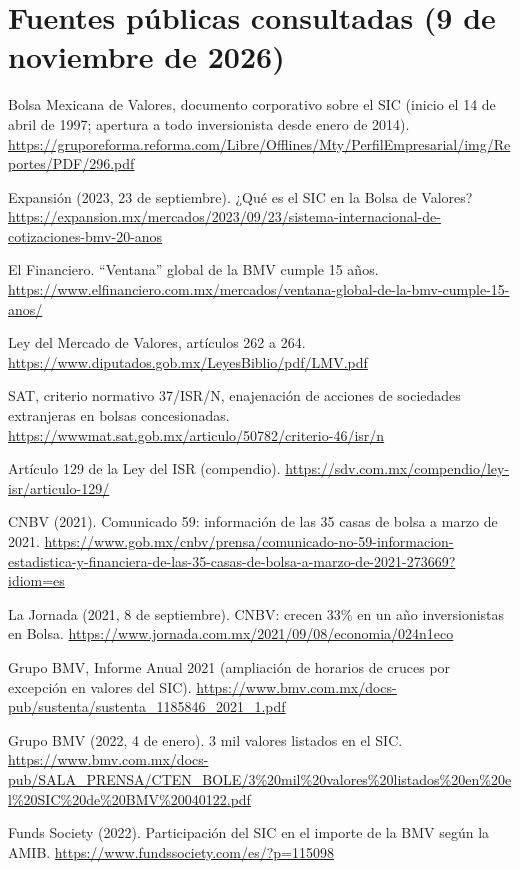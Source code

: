 \documentclass[11pt,letterpaper]{article}
\theoremstyle{definition}
\theoremstyle{plain}
\begin{document}
\section*{Fuentes públicas consultadas (9 de noviembre de 2026)}
\begin{enumerate}[label={[\arabic*]},leftmargin=*]\raggedright\small
\item Bolsa Mexicana de Valores, documento corporativo sobre el SIC (inicio el 14 de abril de 1997; apertura a todo inversionista desde enero de 2014). \url{https://gruporeforma.reforma.com/Libre/Offlines/Mty/PerfilEmpresarial/img/Reportes/PDF/296.pdf}
\item Expansión (2023, 23 de septiembre). ¿Qué es el SIC en la Bolsa de Valores? \url{https://expansion.mx/mercados/2023/09/23/sistema-internacional-de-cotizaciones-bmv-20-anos}
\item El Financiero. ``Ventana'' global de la BMV cumple 15 años. \url{https://www.elfinanciero.com.mx/mercados/ventana-global-de-la-bmv-cumple-15-anos/}
\item Ley del Mercado de Valores, artículos 262 a 264. \url{https://www.diputados.gob.mx/LeyesBiblio/pdf/LMV.pdf}
\item SAT, criterio normativo 37/ISR/N, enajenación de acciones de sociedades extranjeras en bolsas concesionadas. \url{https://wwwmat.sat.gob.mx/articulo/50782/criterio-46/isr/n}
\item Artículo 129 de la Ley del ISR (compendio). \url{https://sdv.com.mx/compendio/ley-isr/articulo-129/}
\item CNBV (2021). Comunicado 59: información de las 35 casas de bolsa a marzo de 2021. \url{https://www.gob.mx/cnbv/prensa/comunicado-no-59-informacion-estadistica-y-financiera-de-las-35-casas-de-bolsa-a-marzo-de-2021-273669?idiom=es}
\item La Jornada (2021, 8 de septiembre). CNBV: crecen 33\% en un año inversionistas en Bolsa. \url{https://www.jornada.com.mx/2021/09/08/economia/024n1eco}
\item Grupo BMV, Informe Anual 2021 (ampliación de horarios de cruces por excepción en valores del SIC). \url{https://www.bmv.com.mx/docs-pub/sustenta/sustenta_1185846_2021_1.pdf}
\item Grupo BMV (2022, 4 de enero). 3 mil valores listados en el SIC. \url{https://www.bmv.com.mx/docs-pub/SALA_PRENSA/CTEN_BOLE/3\%20mil\%20valores\%20listados\%20en\%20el\%20SIC\%20de\%20BMV\%20040122.pdf}
\item Funds Society (2022). Participación del SIC en el importe de la BMV según la AMIB. \url{https://www.fundssociety.com/es/?p=115098}

\end{enumerate}
\end{document}
